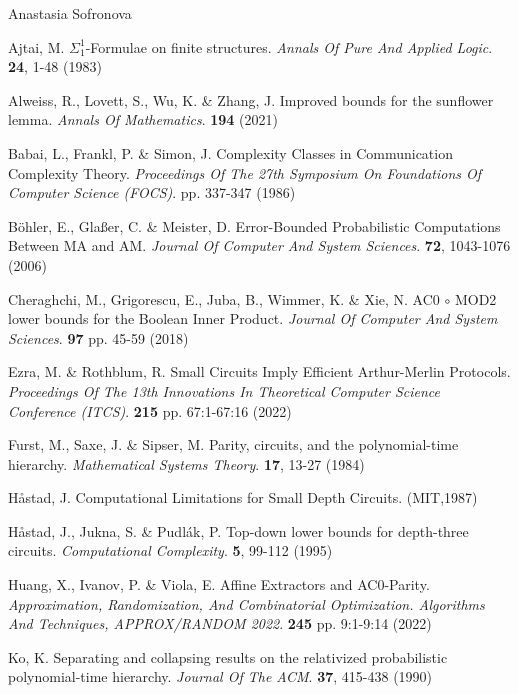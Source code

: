 \documentclass[report]{owrart}
\begin{document}
\begin{report}
\begin{talk}{Anastasia Sofronova}
  \begin{thebibliography}{99}
  
  Ajtai, M. {$\Sigma^1_1$}-Formulae on finite structures. {\em Annals Of Pure And Applied Logic}. \textbf{24}, 1-48 (1983)
  
  Alweiss, R., Lovett, S., Wu, K. \& Zhang, J. Improved bounds for the sunflower lemma. {\em Annals Of Mathematics}. \textbf{194} (2021)
  
  Babai, L., Frankl, P. \& Simon, J. Complexity Classes in Communication Complexity Theory. {\em Proceedings Of The 27th Symposium On Foundations Of Computer Science (FOCS)}. pp. 337-347 (1986)
  
  Böhler, E., Glaßer, C. \& Meister, D. Error-Bounded Probabilistic Computations Between MA and AM. {\em Journal Of Computer And System Sciences}. \textbf{72}, 1043-1076 (2006)
  
  Cheraghchi, M., Grigorescu, E., Juba, B., Wimmer, K. \& Xie, N. AC0 $\circ$ MOD2 lower bounds for the Boolean Inner Product. {\em Journal Of Computer And System Sciences}. \textbf{97} pp. 45-59 (2018)
  
  Ezra, M. \& Rothblum, R. Small Circuits Imply Efficient Arthur-Merlin Protocols. {\em Proceedings Of The 13th Innovations In Theoretical Computer Science Conference (ITCS)}. \textbf{215} pp. 67:1-67:16 (2022)
  
  Furst, M., Saxe, J. \& Sipser, M. Parity, circuits, and the polynomial-time hierarchy. {\em Mathematical Systems Theory}. \textbf{17}, 13-27 (1984)
  
  H\aa stad, J. Computational Limitations for Small Depth Circuits. (MIT,1987)
  
  H\aa stad, J., Jukna, S. \& Pudlák, P. Top-down lower bounds for depth-three circuits. {\em Computational Complexity}. \textbf{5}, 99-112 (1995)
  
  Huang, X., Ivanov, P. \& Viola, E. Affine Extractors and AC0-Parity. {\em Approximation, Randomization, And Combinatorial Optimization. Algorithms And Techniques, APPROX/RANDOM 2022}. \textbf{245} pp. 9:1-9:14 (2022)
  
  Ko, K. Separating and collapsing results on the relativized probabilistic polynomial-time hierarchy. {\em Journal Of The ACM}. \textbf{37}, 415-438 (1990)
  

\end{thebibliography}
\end{talk}
\end{report}
\end{document}
